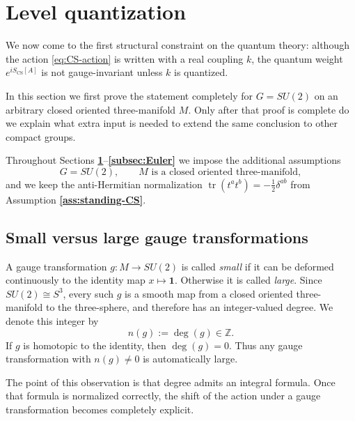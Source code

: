 \documentclass[11pt]{article}
\newcommand{\Z}{\mathbb{Z}}
\newcommand{\tr}{\operatorname{tr}}
\newcommand{\CS}{\operatorname{CS}}
\theoremstyle{definition}
\numberwithin{theorem}{section}
\numberwithin{equation}{section}
\begin{document}
\section{Level quantization}\label{sec:level-quantization}

We now come to the first structural constraint on the quantum theory: although the action \eqref{eq:CS-action} is written with a real coupling $k$, the quantum weight $e^{iS_{\CS}[A]}$ is not gauge-invariant unless $k$ is quantized.

\medskip

\noindent In this section we first prove the statement completely for $G = SU(2)$ on an arbitrary closed oriented three-manifold $M$. Only after that proof is complete do we explain what extra input is needed to extend the same conclusion to other compact groups.

\begin{assumption}\label{ass:level-quantization}
Throughout Sections \textbf{\ref{sec:level-quantization}}--\textbf{\ref{subsec:Euler}} we impose the additional assumptions
\begin{equation*}
G = SU(2),
\qquad
M \text{ is a closed oriented three-manifold},
\end{equation*}
and we keep the anti-Hermitian normalization $\tr(t^at^b) = -\tfrac{1}{2}\delta^{ab}$ from Assumption \textbf{\ref{ass:standing-CS}}.
\end{assumption}

\subsection{Small versus large gauge transformations}

A gauge transformation $g:M\to SU(2)$ is called \emph{small} if it can be deformed continuously to the identity map $x\mapsto \mathbf{1}$. Otherwise it is called \emph{large}. Since $SU(2)\cong S^3$, every such $g$ is a smooth map from a closed oriented three-manifold to the three-sphere, and therefore has an integer-valued degree. We denote this integer by
\begin{equation*}
n(g) := \deg(g)\in \Z.
\end{equation*}
If $g$ is homotopic to the identity, then $\deg(g)=0$. Thus any gauge transformation with $n(g)\neq 0$ is automatically large.

\medskip

\noindent The point of this observation is that degree admits an integral formula. Once that formula is normalized correctly, the shift of the action under a gauge transformation becomes completely explicit.
\end{document}
